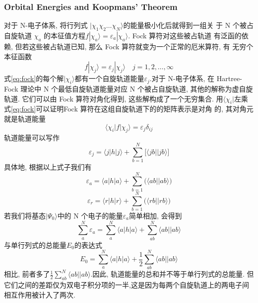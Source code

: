 \documentclass[fontset=none,12pt,a4paper]{ctexart}
\numberwithin{equation}{section}
\begin{document}
\subsubsection{Orbital Energies and Koopmans' Theorem}
对于 N-电子体系, 将行列式 $|\chi_1\chi_2\dots\chi_N\rangle$的能量极小化后就得到一组关 于 N 个被占自旋轨道 ${\chi_a}$
 的本征值方程$f|\chi_a\rangle=\varepsilon_a|\chi_a\rangle$. Fock 算符对这些被占轨道 有泛函的依赖, 
 但若这些被占轨道已知, 那么 Fock 算符就变为一个正常的厄米算符, 有 无穷个本征函数
\begin{equation}
  f|\chi_j\rangle=\varepsilon_j|\chi_j\rangle\quad j=1,2,\dots,\infty
  \label{eq:fock}
\end{equation}
式\ref{eq:fock}的每个解$|\chi_i\rangle$都有一个自旋轨道能量$\varepsilon_j$.对于 N-电子体系, 在 Hartree-Fock 理论中 N 个最低自旋轨道能量对应 N 个被占自旋轨道,
其他的解称为虚自旋轨道. 它们可以由 Fock 算符对角化得到, 这些解构成了一个无穷集合.
用$\langle\chi_i|$左乘式\ref{eq:fock}可以证明Fock 算符在这组自旋轨道下的的矩阵表示是对角 的, 其对角元就是轨道能量
\begin{equation}
  \langle\chi_i|f|\chi_j\rangle=\varepsilon_j\delta_{ij}
\end{equation}
轨道能量可以写作
\begin{equation}
  \varepsilon_j=\langle j|h|j\rangle+\sum_{b=1}^N\bigl[\langle jb||jb\rangle\bigr]
\end{equation}
具体地, 根据以上式子我们有
\begin{equation}
  \varepsilon_a=\langle a|h|a\rangle+\sum_{b=1}^N\bigl(\langle ab||ab\rangle\bigr)
\end{equation}
\begin{equation}
  \varepsilon_r=\langle r|h|r\rangle+\sum_{b=1}^N\bigl(\langle rb||rb\rangle\bigr)
\end{equation}
若我们将基态$|\Psi_0\rangle$中的 N 个电子的能量$\varepsilon_a$简单相加, 会得到
\begin{equation}
  \sum_a^N\varepsilon_a=\sum_a^N\langle a|h|a\rangle+\sum_{ab}^N\langle ab||ab\rangle
\end{equation}
与单行列式的总能量$E_0$的表达式
\begin{equation}
  E_0=\sum_a^N\langle a|h|a\rangle+\frac{1}{2}\sum_{ab}^N\langle ab||ab\rangle
\end{equation}
相比, 前者多了$\frac{1}{2}\sum_{ab}^N\langle ab||ab\rangle$.因此, 轨道能量的总和并不等于单行列式的总能量. 
但它们之间的差距仅为双电子积分项的一半,这是因为每两个自旋轨道上的两电子间相互作用被计入了两次.
\end{document}
